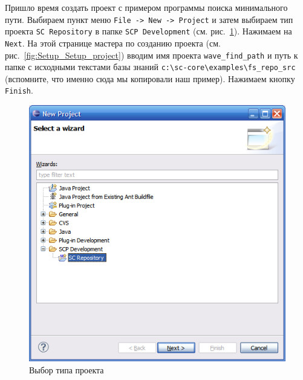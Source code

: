 Пришло время создать проект с примером программы поиска минимального
пути.  Выбираем пункт меню \texttt{File -> New -> Project} и затем
выбираем тип проекта \texttt{SC Repository} в папке \texttt{SCP
  Development}
(см. рис.~\ref{fig:Setup_Select_project_type}). Нажимаем на
\texttt{Next}. На этой странице мастера по созданию проекта
(см. рис.~\ref{fig:Setup_Setup_project}) вводим имя проекта
\verb|wave_find_path| и путь к папке с исходными текстами базы знаний
\verb|c:\sc-core\examples\fs_repo_src| (вспомните, что именно сюда мы
копировали наш пример). Нажимаем кнопку \texttt{Finish}.

\begin{figure}[h!]
  \centering
  \includegraphics[scale=0.7]{images/5/setup/3_Select_project_type}
  \caption{Выбор типа проекта}
  \label{fig:Setup_Select_project_type}
\end{figure}

